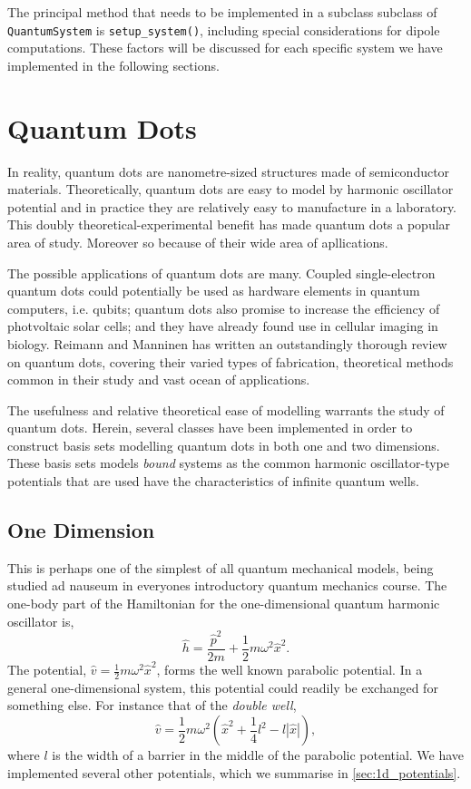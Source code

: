 The principal method that needs to be implemented in a subclass subclass of
\lstinline{QuantumSystem} is
\lstinline{setup_system()}, including special considerations for dipole computations.
These factors will be discussed for each specific system we have implemented in the 
following sections.

\section{Quantum Dots}

In reality, quantum dots are nanometre-sized structures made of semiconductor materials.
Theoretically, quantum dots are easy to model by harmonic oscillator potential and in practice
they are relatively easy to manufacture in a laboratory. This doubly
theoretical-experimental benefit has made quantum dots a popular area of study. Moreover so 
because of their wide area of apllications.

The possible applications of quantum dots are many. Coupled single-electron quantum dots 
could potentially be used as hardware elements in quantum computers, i.e.
qubits\cite{loss1998quantum}; quantum dots also promise to increase the efficiency of 
photvoltaic solar cells; and they have already found use in cellular imaging in biology.
Reimann and Manninen\cite{reimann2002electronic} has written an outstandingly
thorough review on quantum dots, covering their varied types of fabrication, theoretical
methods common in their study and vast ocean of applications.

The usefulness and relative theoretical ease of modelling warrants the study of quantum dots.
Herein, several classes have been implemented in order to construct basis sets modelling 
quantum dots in both one and two dimensions. These basis sets models \emph{bound} systems
as the common harmonic oscillator-type potentials that are used have the characteristics of 
infinite quantum wells. 

\subsection{One Dimension}

This is perhaps one of the simplest of all quantum mechanical 
models, being studied ad nauseum in everyones introductory quantum 
mechanics course. The one-body part of the Hamiltonian for the one-dimensional quantum 
harmonic oscillator is,
\begin{equation}
    \label{eq:1d_ho_hamiltonian}
    \hat{h} = \frac{\hat{p}^2}{2m} + \frac{1}{2}m \omega^2\hat{x}^2.
\end{equation}
The potential, $\hat{v} = \frac{1}{2}m \omega^2\hat{x}^2$, forms the well known 
parabolic potential. In a general one-dimensional system, this potential could 
readily be exchanged for something else. For instance that of the 
\emph{double well},
\begin{equation}
    \hat{v} = \frac{1}{2} m \omega^2
        \left(\hat{x}^2 + \frac{1}{4}l^2 - l |\hat{x}|\right),
\end{equation}
where $l$ is the width of a barrier in the middle of the parabolic 
potential. We have implemented several other potentials, which we summarise 
in \autoref{sec:1d_potentials}.

